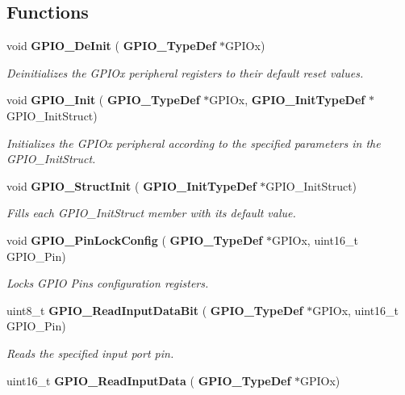 \subsection*{Functions}
\begin{DoxyCompactItemize}
\item 
void \textbf{ G\+P\+I\+O\+\_\+\+De\+Init} (\textbf{ G\+P\+I\+O\+\_\+\+Type\+Def} $\ast$G\+P\+I\+Ox)
\begin{DoxyCompactList}\small\item\em Deinitializes the G\+P\+I\+Ox peripheral registers to their default reset values. \end{DoxyCompactList}\item 
void \textbf{ G\+P\+I\+O\+\_\+\+Init} (\textbf{ G\+P\+I\+O\+\_\+\+Type\+Def} $\ast$G\+P\+I\+Ox, \textbf{ G\+P\+I\+O\+\_\+\+Init\+Type\+Def} $\ast$G\+P\+I\+O\+\_\+\+Init\+Struct)
\begin{DoxyCompactList}\small\item\em Initializes the G\+P\+I\+Ox peripheral according to the specified parameters in the G\+P\+I\+O\+\_\+\+Init\+Struct. \end{DoxyCompactList}\item 
void \textbf{ G\+P\+I\+O\+\_\+\+Struct\+Init} (\textbf{ G\+P\+I\+O\+\_\+\+Init\+Type\+Def} $\ast$G\+P\+I\+O\+\_\+\+Init\+Struct)
\begin{DoxyCompactList}\small\item\em Fills each G\+P\+I\+O\+\_\+\+Init\+Struct member with its default value. \end{DoxyCompactList}\item 
void \textbf{ G\+P\+I\+O\+\_\+\+Pin\+Lock\+Config} (\textbf{ G\+P\+I\+O\+\_\+\+Type\+Def} $\ast$G\+P\+I\+Ox, uint16\+\_\+t G\+P\+I\+O\+\_\+\+Pin)
\begin{DoxyCompactList}\small\item\em Locks G\+P\+IO Pins configuration registers. \end{DoxyCompactList}\item 
uint8\+\_\+t \textbf{ G\+P\+I\+O\+\_\+\+Read\+Input\+Data\+Bit} (\textbf{ G\+P\+I\+O\+\_\+\+Type\+Def} $\ast$G\+P\+I\+Ox, uint16\+\_\+t G\+P\+I\+O\+\_\+\+Pin)
\begin{DoxyCompactList}\small\item\em Reads the specified input port pin. \end{DoxyCompactList}\item 
uint16\+\_\+t \textbf{ G\+P\+I\+O\+\_\+\+Read\+Input\+Data} (\textbf{ G\+P\+I\+O\+\_\+\+Type\+Def} $\ast$G\+P\+I\+Ox)

\end{DoxyCompactItemize}
